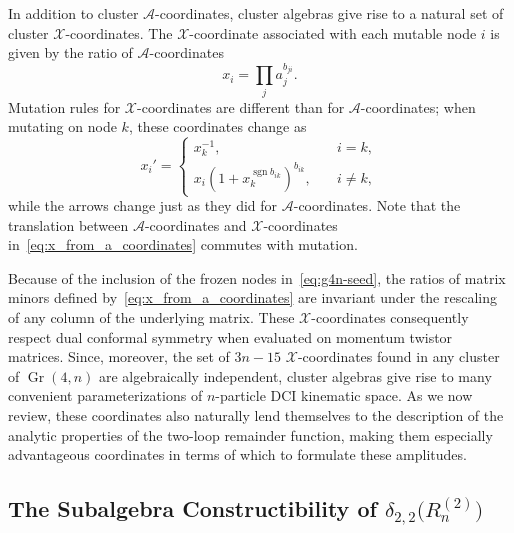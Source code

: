 \documentclass[11pt]{article}
\DeclareMathOperator{\Gr}{Gr}
\DeclareMathOperator{\sgn}{sgn}
\def\x{\mathcal{X}}
\def\xcoords{$\mathcal{X}$-coordinates }
\def\a{\mathcal{A}}
\def\pdfeq#1{\texorpdfstring{$#1$}{a}}
\begin{document}
In addition to cluster $\a$-coordinates, cluster algebras give rise to a natural set of cluster $\x$-coordinates. The $\x$-coordinate associated with each mutable node $i$ is given by the ratio of $\a$-coordinates
\begin{equation} \label{eq:x_from_a_coordinates}
	x_i = \prod_j a_j^{b_{ji}}. 	
\end{equation} 
Mutation rules for \xcoords are different than for $\a$-coordinates; when mutating on node $k$, these coordinates change as 
\begin{equation}
  \label{eq:x-coord-mutation}
  x_{i}' =
  \begin{cases}
    x_{k}^{-1}, &\quad i=k,\\
    x_{i} (1+x_{k}^{\sgn b_{i k}})^{b_{i k}}, &\quad i \neq k ,
  \end{cases}
\end{equation}
while the arrows change just as they did for $\a$-coordinates. Note that the translation between $\a$-coordinates and $\x$-coordinates in~\eqref{eq:x_from_a_coordinates} commutes with mutation. 

Because of the inclusion of the frozen nodes in~\eqref{eq:g4n-seed}, the ratios of matrix minors defined by~\eqref{eq:x_from_a_coordinates} are invariant under the rescaling of any column of the underlying matrix. These $\x$-coordinates consequently respect dual conformal symmetry when evaluated on momentum twistor matrices. Since, moreover, the set of $3n{-}15$ $\x$-coordinates found in any cluster of $\Gr(4,n)$ are algebraically independent, cluster algebras give rise to many convenient parameterizations of $n$-particle DCI kinematic space. As we now review, these coordinates also naturally lend themselves to the description of the analytic properties of the two-loop remainder function, making them especially advantageous coordinates in terms of which to formulate these amplitudes. 

\subsection{The Subalgebra Constructibility of \pdfeq{\delta_{2,2}\big(R_n^{(2)} \big)}}
\end{document}
